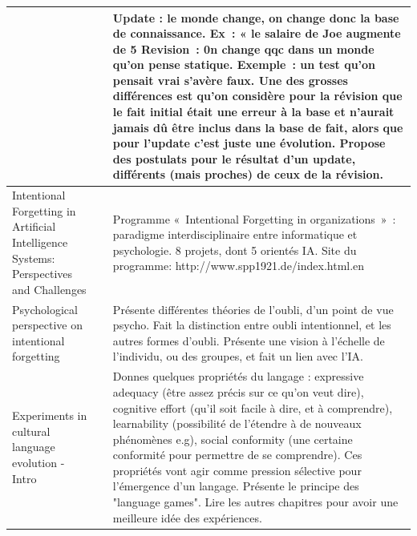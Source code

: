 \documentclass[french]{article}
\begin{document}
\begin{table}[h]
\begin{center}
\begin{tabular}{|p{}|p{}|p{}|}
            &
            & Update : le monde change, on change donc la base de connaissance. Ex : « le salaire de Joe augmente de 5%
            Revision : 0n change qqc dans un monde qu’on pense statique. Exemple : un test qu’on pensait vrai s’avère faux.
            Une des grosses différences est qu’on considère pour la révision que le fait initial était une erreur à la base et n’aurait jamais dû être inclus dans la base de fait, alors que pour l’update c’est juste une évolution. Propose des postulats pour le résultat d'un update, différents (mais proches) de ceux de la révision.
            \\
            \hline
            Intentional Forgetting in Artificial Intelligence Systems: Perspectives and Challenges \cite{timm_intentional_2018}
            & 
            & Programme « Intentional Forgetting in organizations » : paradigme interdisciplinaire entre informatique et psychologie. 8 projets, dont 5 orientés IA.
            Site du programme: http://www.spp1921.de/index.html.en \\
            \hline
            Psychological perspective on intentional forgetting \cite{ellwart_psychological_2019}
            & 
            & Présente différentes théories de l’oubli, d’un point de vue psycho. Fait la distinction entre oubli intentionnel, et les autres formes d’oubli. Présente une vision à l’échelle de l’individu, ou des groupes, et fait un lien avec l’IA. \\
            \hline
            Experiments in cultural language evolution - Intro \cite{steels_experiments_2012}
            &
            & Donnes quelques propriétés du langage : expressive adequacy (être assez précis sur ce qu'on veut dire), cognitive effort (qu'il soit facile à dire, et à comprendre), learnability (possibilité de l'étendre à de nouveaux phénomènes e.g), social conformity (une certaine conformité pour permettre de se comprendre). Ces propriétés vont agir comme pression sélective pour l'émergence d'un langage. Présente le principe des "language games". Lire les autres chapitres pour avoir une meilleure idée des expériences. \\
            \hline
        \end{tabular}
    \end{center}
    \end{table}
    \newpage
\end{document}
